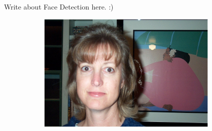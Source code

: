 Write about Face Detection here. :)

\begin{figure}[H]
\centering

\begin{subfigure}{.4\textwidth}
  \centering
  \includegraphics[width=0.95\textwidth]{img/fd/Original.png}
  \caption{}
\end{subfigure}%


\end{figure}

